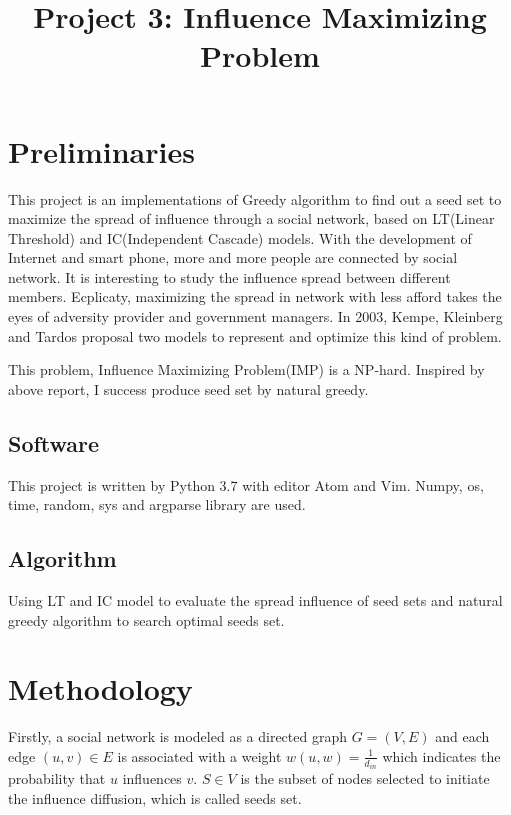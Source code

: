 \documentclass[conference,compsoc]{IEEEtran}
\begin{document}
\title{Project 3: Influence Maximizing Problem }

\author{
}

\maketitle

\IEEEpeerreviewmaketitle

\section{Preliminaries}
This project is an implementations of Greedy algorithm to find out a seed set
to maximize the spread of influence through a social network, based on LT(Linear
Threshold) and IC(Independent Cascade) models. With the development of Internet
and smart phone, more and more people are connected by social network. It is
interesting to study the influence spread between different members. Ecplicaty,
maximizing the spread in network with less afford takes the eyes of adversity
provider and government managers. In 2003, Kempe, Kleinberg and Tardos proposal
two models to represent and optimize this kind of problem.\cite{1}

This problem, Influence Maximizing Problem(IMP) is a NP-hard. Inspired by
above report, I success produce seed set by natural greedy.


\subsection{Software}
This project is written by Python 3.7 with editor Atom and Vim. Numpy, os, time,
random, sys and argparse library are used.

\subsection{Algorithm}
Using LT and IC model to evaluate the spread influence of seed sets and natural
greedy algorithm to search optimal seeds set.


\section{Methodology}
Firstly, a social network is modeled as a directed graph $G=(V,E)$ and each
edge $(u,v)\in E$ is associated with a weight $w(u,w)=\frac{1}{d_{in}}$ which
indicates the probability that $u$ influences $v$. $S\in V$ is the subset of
nodes selected to initiate the influence diffusion,  which is called seeds set.
\end{document}
